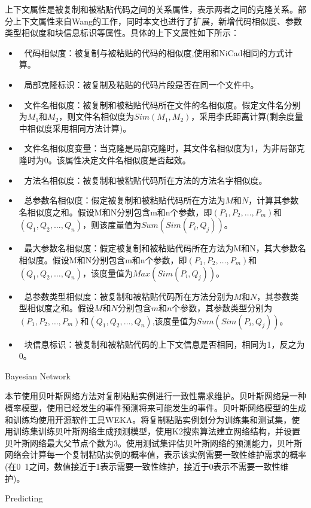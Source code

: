 上下文属性是被复制和被粘贴代码之间的关系属性，表示两者之间的克隆关系。部分上下文属性来自Wang的工作，同时本文也进行了扩展，新增代码相似度、参数类型相似度和块信息标识等属性。具体的上下文属性如下所示：
\begin{itemize}
\item 	代码相似度：被复制与被粘贴的代码的相似度,使用和NiCad相同的方式计算。
\item 	局部克隆标识：被复制及粘贴的代码片段是否在同一个文件中。
\item 	文件名相似度：被复制和被粘贴代码所在文件的名相似度。假定文件名分别为$M_1$和$M_2$，则文件名相似度为$Sim(M_1,M_2)$，采用李氏距离\cite{levenshtein1966binary}计算(剩余度量中相似度采用相同方法计算)。
\item 	文件名相似度变量：当克隆是局部克隆时，其文件名相似度为1，为非局部克隆时为0。该属性决定文件名相似度是否起效。
\item 	方法名相似度：被复制和被粘贴代码所在方法的方法名字相似度。
\item 	总参数名相似度：假定被复制和被粘贴代码所在方法为$M$和$N$，计算其参数名相似度之和。假设M和N分别包含m和n个参数，即$(P_1,P_2,…,P_m)$和$(Q_1,Q_2,…,Q_n)$，则该度量值为$Sum(Sim(P_i,Q_j))$。
\item 	最大参数名相似度：假定被复制和被粘贴代码所在方法为M和N，其大参数名相似度。假设M和N分别包含m和n个参数，即$(P_1,P_2,…,P_m)$和$(Q_1,Q_2,…,Q_n)$，该度量值为$Max(Sim(P_i,Q_j))$。
\item 	总参数类型相似度：被复制和被粘贴代码所在方法分别为$M$和$N$，其参数类型相似度之和。假设$M$和$N$分别包含$m$和$n$个参数，其参数类型分别为$(P_1,P_2,…,P_m)$和$(Q_1,Q_2,…,Q_n)$,该度量值为$Sum(Sim(P_i,Q_j))$。
\item 	块信息标识：被复制和被粘贴代码的上下文信息是否相同，相同为1，反之为0。
\end{itemize}

{Bayesian Network}

本节使用贝叶斯网络方法对复制粘贴实例进行一致性需求维护。贝叶斯网络是一种概率模型，使用已经发生的事件预测将来可能发生的事件\cite{friedman1997bayesian}。贝叶斯网络模型的生成和训练均使用开源软件工具WEKA。将复制粘贴实例划分为训练集和测试集，使用训练集训练贝叶斯网络生成预测模型，使用K2搜索算法建立网络结构，并设置贝叶斯网络最大父节点个数为3。使用测试集评估贝叶斯网络的预测能力，贝叶斯网络会计算每一个复制粘贴实例的概率值，表示该实例需要一致性维护需求的概率(在0~1之间，数值接近于1表示需要一致性维护，接近于0表示不需要一致性维护)。

{Predicting}

